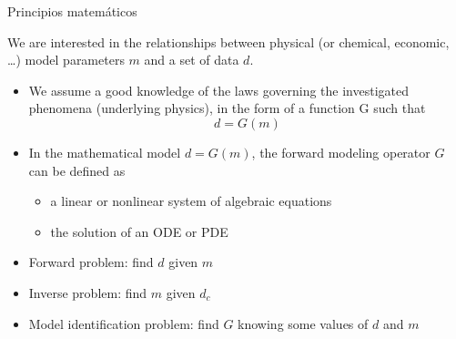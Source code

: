 \documentclass{beamer}
\begin{document}
\begin{frame}
 {Principios matemáticos}
 
 We are interested in the relationships between physical (or chemical, economic, \dots) model parameters $m$ and a set of data $d$.
 
 \begin{itemize}
  \item We assume a good knowledge of the laws governing the investigated phenomena (underlying physics), in the form of a function G such that
  \begin{equation}
   d = G (m )
  \end{equation}
  \item In the mathematical model $d = G(m)$, the forward modeling operator $G$ can be defined as
  \begin{itemize}
   \item a linear or nonlinear system of algebraic equations
   \item the solution of an ODE or PDE
  \end{itemize}
  \item Forward problem: find $d$ given $m$
  \item Inverse problem: find $m$ given $d_c$
  \item Model identification problem: find $G$ knowing some values of $d$ and $m$
 \end{itemize}
 
\end{frame}
\end{document}
